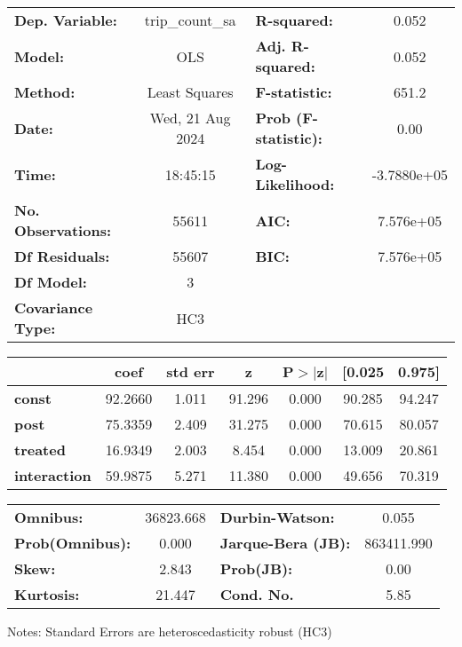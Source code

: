 \begin{center}
\begin{tabular}{lclc}
\toprule
\textbf{Dep. Variable:}    & trip\_count\_sa  & \textbf{  R-squared:         } &      0.052   \\
\textbf{Model:}            &       OLS        & \textbf{  Adj. R-squared:    } &      0.052   \\
\textbf{Method:}           &  Least Squares   & \textbf{  F-statistic:       } &      651.2   \\
\textbf{Date:}             & Wed, 21 Aug 2024 & \textbf{  Prob (F-statistic):} &      0.00    \\
\textbf{Time:}             &     18:45:15     & \textbf{  Log-Likelihood:    } & -3.7880e+05  \\
\textbf{No. Observations:} &       55611      & \textbf{  AIC:               } &  7.576e+05   \\
\textbf{Df Residuals:}     &       55607      & \textbf{  BIC:               } &  7.576e+05   \\
\textbf{Df Model:}         &           3      & \textbf{                     } &              \\
\textbf{Covariance Type:}  &       HC3        & \textbf{                     } &              \\
\bottomrule
\end{tabular}
\begin{tabular}{lcccccc}
                     & \textbf{coef} & \textbf{std err} & \textbf{z} & \textbf{P$> |$z$|$} & \textbf{[0.025} & \textbf{0.975]}  \\
\midrule
\textbf{const}       &      92.2660  &        1.011     &    91.296  &         0.000        &       90.285    &       94.247     \\
\textbf{post}        &      75.3359  &        2.409     &    31.275  &         0.000        &       70.615    &       80.057     \\
\textbf{treated}     &      16.9349  &        2.003     &     8.454  &         0.000        &       13.009    &       20.861     \\
\textbf{interaction} &      59.9875  &        5.271     &    11.380  &         0.000        &       49.656    &       70.319     \\
\bottomrule
\end{tabular}
\begin{tabular}{lclc}
\textbf{Omnibus:}       & 36823.668 & \textbf{  Durbin-Watson:     } &     0.055   \\
\textbf{Prob(Omnibus):} &    0.000  & \textbf{  Jarque-Bera (JB):  } & 863411.990  \\
\textbf{Skew:}          &    2.843  & \textbf{  Prob(JB):          } &      0.00   \\
\textbf{Kurtosis:}      &   21.447  & \textbf{  Cond. No.          } &      5.85   \\
\bottomrule
\end{tabular}
\end{center}

Notes: \newline
 [1] Standard Errors are heteroscedasticity robust (HC3)